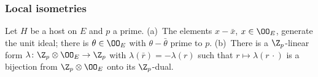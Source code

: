 \subsubsection*{Local isometries}

\begin{lemma}\label{pf:tower:theta}
Let $H$ be a host on $E$ and $p$ a prime.
(a)~The elements $x-\bar x$, $x\in\OO_E$, generate the unit ideal; there is $\theta\in\OO_E$ with $\theta-\bar\theta$ prime to
$p$.
(b)~There is a $\Z_p$-linear form $\lambda\colon\Z_p\otimes\OO_E\to\Z_p$ with $\lambda(\bar r)=-\lambda(r)$ such that
$r\mapsto\lambda(r\,\cdot)$ is a bijection from $\Z_p\otimes\OO_E$ onto its $\Z_p$-dual.
\end{lemma}

